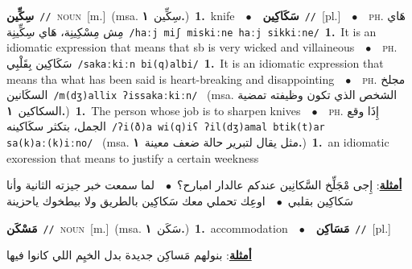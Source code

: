 \documentclass[10pt,a4paper,twoside]{article} %
\begin{document}
\begin{multicols}{2}
{\setlength\topsep{0pt}\textbf{\foreignlanguage{arabic}{سِكِّين}}\ {\color{gray}\texttt{//}\color{black}}\ \textsc{noun}\ [m.]\ \color{gray}(msa. \foreignlanguage{arabic}{سِكِّين}~\foreignlanguage{arabic}{\textbf{١.}})\color{black}\ \textbf{1.}~knife\ \ $\bullet$\ \ \setlength\topsep{0pt}\textbf{\foreignlanguage{arabic}{سَكَاكِين}}\ {\color{gray}\texttt{//}\color{black}}\ [pl.]\ \ $\bullet$\ \ \textsc{ph.} \color{gray} \foreignlanguage{arabic}{هَاي مِش مِسْكِينِة، هَاي سِكِّينِة}\color{black}\ {\color{gray}\texttt{/{\sffamily haːj miʃ miskiːne haːj sikkiːne}/}\color{black}}\ \textbf{1.}~It is an idiomatic expression that means that sb is very wicked and villaineous\ \ $\bullet$\ \ \textsc{ph.} \color{gray} \foreignlanguage{arabic}{سَكَاكِين بِقَلْبِي}\color{black}\ {\color{gray}\texttt{/{\sffamily sakaːkiːn bi(q)albi}/}\color{black}}\ \textbf{1.}~It is an idiomatic expression that means tha what has been said is heart-breaking and disappointing\ \ $\bullet$\ \ \textsc{ph.} \color{gray} \foreignlanguage{arabic}{مجلخ السكَانين}\color{black}\ {\color{gray}\texttt{/{\sffamily m(dʒ)allix ʔissakaːkiːn}/}\color{black}}\ \color{gray} (msa. \foreignlanguage{arabic}{الشخص الذي تكون وظيفته تمضية السكاكين}~\foreignlanguage{arabic}{\textbf{١.}})\color{black}\ \textbf{1.}~The person whose job is to sharpen knives\ \ $\bullet$\ \ \textsc{ph.} \color{gray} \foreignlanguage{arabic}{إِذَا وقع الجمل، بتكثر سكَاكينه}\color{black}\ {\color{gray}\texttt{/{\sffamily ʔi(ð)a wi(q)iʕ ʔil(dʒ)amal btik(t)ar sa(k)aː(k)iːno}/}\color{black}}\ \color{gray} (msa. \foreignlanguage{arabic}{مثل يقال لتبرير حالة ضعف معينة}~\foreignlanguage{arabic}{\textbf{١.}})\color{black}\ \textbf{1.}~an idiomatic exoression that means  to justify a certain weekness\  \begin{flushright}\color{gray}\foreignlanguage{arabic}{\textbf{\underline{\foreignlanguage{arabic}{أمثلة}}}: إِجى مْجَلِّخ السَّكانِين عندكم عالدار امبارح؟\ $\bullet$\ \  لما سمعت خبر جيزته الثانية وأنا سَكاكِين بقلبي\ $\bullet$\ \  اوعِك تحملي معك سَكاكِين بالطريق ولا بيطخوك ياحزينة}\end{flushright}\color{black}} \vspace{2mm}

{\setlength\topsep{0pt}\textbf{\foreignlanguage{arabic}{مَسْكَن}}\ {\color{gray}\texttt{//}\color{black}}\ \textsc{noun}\ [m.]\ \color{gray}(msa. \foreignlanguage{arabic}{سَكَن}~\foreignlanguage{arabic}{\textbf{١.}})\color{black}\ \textbf{1.}~accommodation\ \ $\bullet$\ \ \setlength\topsep{0pt}\textbf{\foreignlanguage{arabic}{مَسَاكِن}}\ {\color{gray}\texttt{//}\color{black}}\ [pl.]\  \begin{flushright}\color{gray}\foreignlanguage{arabic}{\textbf{\underline{\foreignlanguage{arabic}{أمثلة}}}: بنولهم مَساكِن جديدة  بدل الخيِم اللي كانوا فيها}\end{flushright}\color{black}} \vspace{2mm}


\end{multicols}
\end{document}
